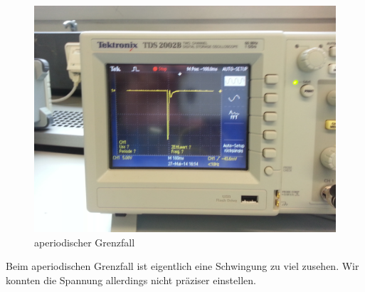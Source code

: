 \documentclass[a4paper,titlepage]{scrartcl}
\numberwithin{equation}{section}
\begin{document}
\begin{figure}[H]
\centering
\includegraphics[scale=.08]{bilder/aufgabe_4_3_3.jpg} 
\caption{aperiodischer Grenzfall}
\end{figure}

Beim aperiodischen Grenzfall ist eigentlich eine Schwingung zu viel zusehen. Wir konnten die Spannung allerdings nicht präziser einstellen.
\end{document}
